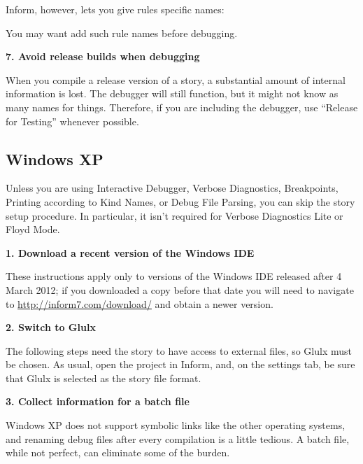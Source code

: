 \documentclass{book}
\newcommand{\lastpagebreak}{\vfill\pagebreak}
\begin{document}
\begin{quote}
  
\end{quote}

Inform, however, lets you give rules specific names:

\begin{quote}
  
\end{quote}

You may want add such rule names before debugging.

\lastpagebreak

\textbf{7. Avoid release builds when debugging}

When you compile a release version of a story, a substantial amount of internal
information is lost.  The debugger will still function, but it might not know as
many names for things.  Therefore, if you are including the debugger, use
``Release for Testing'' whenever possible.

\lastpagebreak

\subsection{Windows XP}

Unless you are using Interactive Debugger, Verbose Diagnostics, Breakpoints,
Printing according to Kind Names, or Debug File Parsing, you can skip the story
setup procedure.  In particular, it isn't required for Verbose Diagnostics Lite
or Floyd Mode.

\textbf{1. Download a recent version of the Windows IDE}

These instructions apply only to versions of the Windows IDE released after 4
March 2012; if you downloaded a copy before that date you will need to navigate
to \url{http://inform7.com/download/} and obtain a newer version.

\textbf{2. Switch to Glulx}

The following steps need the story to have access to external files, so Glulx
must be chosen.  As usual, open the project in Inform, and, on the settings tab,
be sure that Glulx is selected as the story file format.

\textbf{3. Collect information for a batch file}

Windows XP does not support symbolic links like the other operating systems, and
renaming debug files after every compilation is a little tedious.  A batch file,
while not perfect, can eliminate some of the burden.
\end{document}
